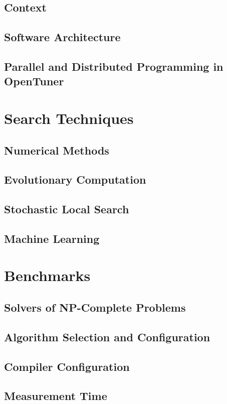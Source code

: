 \subsection{Context}
\label{sec:context}

\subsection{Software Architecture}
\label{sec:arch}

\subsection{Parallel and Distributed Programming in OpenTuner}
\label{sec:opentuner-parallel}

\section{Search Techniques}
\label{sec:techniques}

\subsection{Numerical Methods}
\label{subsec:num}

\subsection{Evolutionary Computation}
\label{subsec:tuninevolcomp}

\subsection{Stochastic Local Search}
\label{subsec:tuningsls}

\subsection{Machine Learning}
\label{subsec:tuningml}

\section{Benchmarks}
\label{sec:benchmarks}

\subsection{Solvers of NP-Complete Problems}
\label{subsec:np}

\subsection{Algorithm Selection and Configuration}
\label{subsec:algsel}

\subsection{Compiler Configuration}
\label{subsec:compilerconfig}

\subsection{Measurement Time}
\label{subsec:measure}
